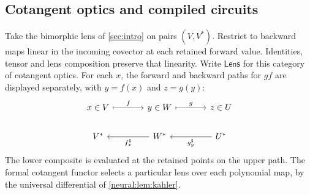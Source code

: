 \documentclass[11pt,a4paper]{article}
\theoremstyle{definition}
\theoremstyle{remark}\newaliascnt{remark}{theorem}
\newcommand{\lens}{\mathsf{Lens}}
\numberwithin{equation}{section}
\begin{document}
\subsection{Cotangent optics and compiled circuits}
Take the bimorphic lens of \cref{sec:intro} on pairs \((V,V^*)\). Restrict to backward maps linear in the incoming covector at each retained forward value. Identities, tensor and lens composition preserve that linearity. Write \(\lens\) for this category of cotangent optics. For each \(x\), the forward and backward paths for \(g f\) are displayed separately, with \(y=f(x)\) and \(z=g(y)\):
\[
\begin{tikzcd}[column sep=large]
 x\in V\arrow[r,mapsto,"f"]&y\in W\arrow[r,mapsto,"g"]&z\in U\\
 V^*& W^*\arrow[l,"f^\sharp_x"]&U^*\arrow[l,"g^\sharp_y"]
\end{tikzcd}
\]
The lower composite is evaluated at the retained points on the upper path. The formal cotangent functor selects a particular lens over each polynomial map, by the universal differential of \cref{neural:lem:kahler}.
\end{document}
